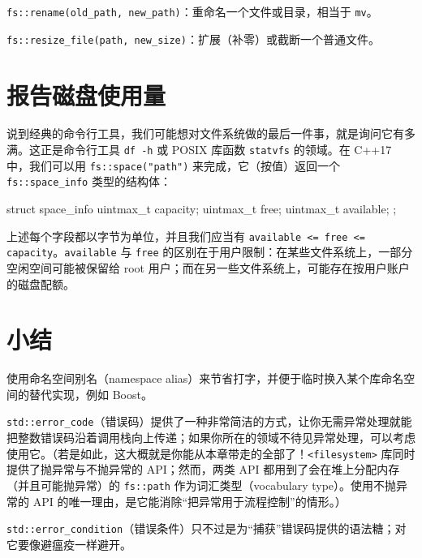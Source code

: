 \texttt{fs::\allowbreak{}rename(\allowbreak{}old\_\allowbreak{}path,\allowbreak{} new\_\allowbreak{}path)\allowbreak{}}：重命名一个文件或目录，相当于 \texttt{mv}。

\texttt{fs::\allowbreak{}resize\_\allowbreak{}file(\allowbreak{}path,\allowbreak{} new\_\allowbreak{}size)\allowbreak{}}：扩展（补零）或截断一个普通文件。

\section{报告磁盘使用量}

说到经典的命令行工具，我们可能想对文件系统做的最后一件事，就是询问它有多满。这正是命令行工具 \texttt{df -h} 或 POSIX 库函数 \texttt{statvfs} 的领域。在 C++17 中，我们可以用 \texttt{fs::\allowbreak{}space(\allowbreak{}"path")\allowbreak{}} 来完成，它（按值）返回一个 \texttt{fs::\allowbreak{}space\_\allowbreak{}info} 类型的结构体：

\begin{codebox}[cpp]
 struct space_info {
    uintmax_t capacity;
    uintmax_t free;
    uintmax_t available;
 };
\end{codebox}

上述每个字段都以字节为单位，并且我们应当有 \texttt{available <= free <= capacity}。\texttt{available} 与 \texttt{free} 的区别在于用户限制：在某些文件系统上，一部分空闲空间可能被保留给 root 用户；而在另一些文件系统上，可能存在按用户账户的磁盘配额。

\section{小结}

使用命名空间别名（namespace alias）来节省打字，并便于临时换入某个库命名空间的替代实现，例如 Boost。

\texttt{std::\allowbreak{}error\_\allowbreak{}code}（错误码）提供了一种非常简洁的方式，让你无需异常处理就能把整数错误码沿着调用栈向上传递；如果你所在的领域不待见异常处理，可以考虑使用它。（若是如此，这大概就是你能从本章带走的全部了！\texttt{<filesystem>\allowbreak{}} 库同时提供了抛异常与不抛异常的 API；然而，两类 API 都用到了会在堆上分配内存（并且可能抛异常）的 \texttt{fs::\allowbreak{}path} 作为词汇类型（vocabulary type）。使用不抛异常的 API 的唯一理由，是它能消除“把异常用于流程控制”的情形。）

\texttt{std::\allowbreak{}error\_\allowbreak{}condition}（错误条件）只不过是为“捕获”错误码提供的语法糖；对它要像避瘟疫一样避开。

